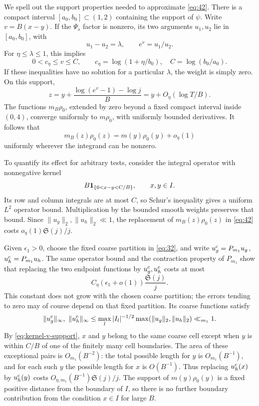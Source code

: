 We spell out the support properties needed to approximate
\eqref{eq:42}.  There is a compact interval \([a_0,b_0]\subset(1,2)\)
containing the support of \(\psi\).  Write \(v=B(x-y)\).  If the
\(\Psi_s\) factor is nonzero, its two arguments \(u_1,u_2\) lie
in \([a_0,b_0]\), with
\[
 u_1-u_2=\lambda,\qquad e^v=u_1/u_2.
\]
For \(\eta\le\lambda\le1\), this implies
\begin{equation}\label{eq:kernel-v-support}
 0<c_\eta\le v\le C,
 \qquad c_\eta=\log(1+\eta/b_0),\quad
 C=\log(b_0/a_0).
\end{equation}
If these inequalities have no solution for a particular \(\lambda\),
the weight is simply zero.  On this support,
\[
 z=y+\frac{\log(e^v-1)-\log j}{B}
   =y+O_\eta(\log T/B).
\]
The functions \(m_B\rho_0\), extended by zero beyond a fixed compact
interval inside \((0,4)\), converge uniformly to \(m\rho_0\), with
uniformly bounded derivatives.  It follows that
\[
 m_B(z)\rho_0(z)=m(y)\rho_0(y)+o_\eta(1)
\]
uniformly wherever the integrand can be nonzero.

To quantify its effect for arbitrary tests, consider the integral
operator with nonnegative kernel
\[
 B\mathbf 1_{\{0<x-y<C/B\}},\qquad x,y\in I.
\]
Its row and column integrals are at most \(C\), so Schur's inequality
gives a uniform \(L^2\) operator bound.  Multiplication by the bounded
smooth weights preserves that bound.  Since
\(\|u_g\|_2,\|u_h\|_2\ll1\), the replacement of \(m_B(z)\rho_0(z)\)
in \eqref{eq:42} costs
\(o_\eta(1)\mathfrak S(j)/j\).

Given \(\epsilon_1>0\), choose the fixed coarse partition in
\eqref{eq:32}, and write
\(u_g^{\rm c}=P_{m_1}u_g\), \(u_h^{\rm c}=P_{m_1}u_h\).
The same operator bound and the contraction property of
\(P_{m_1}\) show that replacing the two endpoint functions by
\(u_g^{\rm c},u_h^{\rm c}\) costs at most
\[
 C_\eta(\epsilon_1+o(1))\frac{\mathfrak S(j)}j.
\]
This constant does not grow with the chosen coarse partition;
the errors tending to zero may of course depend on that fixed
partition.  Its coarse functions satisfy
\[
 \|u_g^{\rm c}\|_\infty,\ \|u_h^{\rm c}\|_\infty
 \le \max_l |I_l|^{-1/2}
       \max(\|u_g\|_2,\|u_h\|_2)\ll_{m_1}1.
\]
By \eqref{eq:kernel-v-support}, \(x\) and \(y\) belong to the same
coarse cell except when \(y\) is within \(C/B\) of one of the
finitely many cell boundaries.  The area of these exceptional
pairs is \(O_{m_1}(B^{-2})\): the total possible length for \(y\)
is \(O_{m_1}(B^{-1})\), and for each such \(y\) the possible length
for \(x\) is \(O(B^{-1})\).  Thus replacing
\(u_h^{\rm c}(x)\) by \(u_h^{\rm c}(y)\) costs
\(O_{\eta,m_1}(B^{-1})\mathfrak S(j)/j\).  The support of
\(m(y)\rho_0(y)\) is a fixed positive distance from the boundary of
\(I\), so there is no further boundary contribution from the
condition \(x\in I\) for large \(B\).

